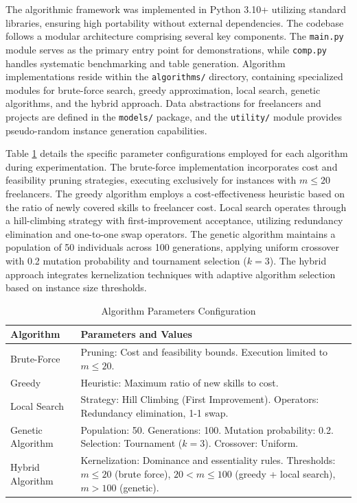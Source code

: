 \documentclass[12pt,a4paper]{article}
\begin{document}
The algorithmic framework was implemented in Python 3.10+ utilizing standard libraries, ensuring high portability without external dependencies. The codebase follows a modular architecture comprising several key components. The \texttt{main.py} module serves as the primary entry point for demonstrations, while \texttt{comp.py} handles systematic benchmarking and table generation. Algorithm implementations reside within the \texttt{algorithms/} directory, containing specialized modules for brute-force search, greedy approximation, local search, genetic algorithms, and the hybrid approach. Data abstractions for freelancers and projects are defined in the \texttt{models/} package, and the \texttt{utility/} module provides pseudo-random instance generation capabilities.

Table \ref{tab:algorithm-parameters} details the specific parameter configurations employed for each algorithm during experimentation. The brute-force implementation incorporates cost and feasibility pruning strategies, executing exclusively for instances with $m \leq 20$ freelancers. The greedy algorithm employs a cost-effectiveness heuristic based on the ratio of newly covered skills to freelancer cost. Local search operates through a hill-climbing strategy with first-improvement acceptance, utilizing redundancy elimination and one-to-one swap operators. The genetic algorithm maintains a population of 50 individuals across 100 generations, applying uniform crossover with 0.2 mutation probability and tournament selection ($k=3$). The hybrid approach integrates kernelization techniques with adaptive algorithm selection based on instance size thresholds.

\begin{table}[H]
	\centering
	\caption{Algorithm Parameters Configuration}
	\label{tab:algorithm-parameters}
	\begin{tabular}{@{}lp{10cm}@{}}
		\toprule
		\textbf{Algorithm} & \textbf{Parameters and Values} \\
		\midrule
		Brute-Force & Pruning: Cost and feasibility bounds. Execution limited to $m \leq 20$. \\
		Greedy & Heuristic: Maximum ratio of new skills to cost. \\
		Local Search & Strategy: Hill Climbing (First Improvement). Operators: Redundancy elimination, 1-1 swap. \\
		Genetic Algorithm & Population: 50. Generations: 100. Mutation probability: 0.2. Selection: Tournament ($k=3$). Crossover: Uniform. \\
		Hybrid Algorithm & Kernelization: Dominance and essentiality rules. Thresholds: $m \leq 20$ (brute force), $20 < m \leq 100$ (greedy + local search), $m > 100$ (genetic). \\
		\bottomrule
	\end{tabular}
\end{table}
\end{document}

